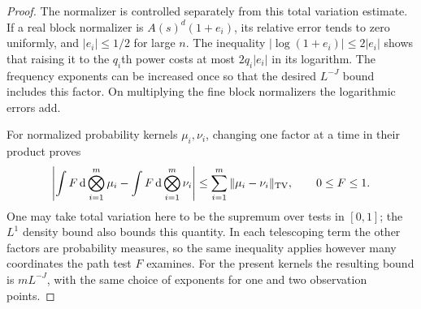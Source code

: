\documentclass[11pt]{article}
\theoremstyle{definition}\newtheorem{definition}[theorem]{Definition}
\theoremstyle{remark}\newtheorem{remark}[theorem]{Remark}
\newcommand{\dd}{\,\mathrm d}\newcommand{\ind}{\mathbf1}
\numberwithin{equation}{section}\allowdisplaybreaks
\begin{document}
\begin{proof}
The normalizer is controlled separately from this total
variation estimate. If a real block normalizer is
$A(s)^d(1+e_i)$, its relative error tends to zero uniformly, and
$|e_i|\le1/2$ for large $n$. The inequality
$|\log(1+e_i)|\le2|e_i|$ shows that raising it to the $q_i$th
power costs at most $2q_i|e_i|$ in its logarithm. The frequency
exponents can be increased once so that the desired
$L^{-J}$ bound includes this factor. On multiplying the fine
block normalizers the logarithmic errors add.

For normalized probability kernels $\mu_i,\nu_i$, changing
one factor at a time in their product proves
\[
 \left|\int F\dd\bigotimes_{i=1}^m\mu_i
       -\int F\dd\bigotimes_{i=1}^m\nu_i\right|
 \le\sum_{i=1}^m\|\mu_i-\nu_i\|_{\TV},
 \qquad 0\le F\le1.
\]
One may take total variation here to be the supremum over
tests in $[0,1]$; the $L^1$ density bound also bounds this
quantity. In each telescoping term the other factors are
probability measures, so the same inequality applies however
many coordinates the path test $F$ examines. For the present
kernels the resulting bound is $mL^{-J}$, with the same
choice of exponents for one and two observation points.

\end{proof}
\end{document}
